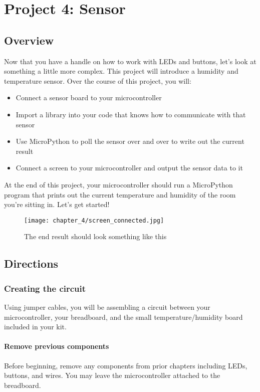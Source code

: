 \chapter{Project 4: Sensor}

\section{Overview}
Now that you have a handle on how to work with LEDs and buttons, let's look at something a little more complex.
This project will introduce a humidity and temperature sensor. Over the course of this project, you will:
\begin{itemize}
    \item Connect a sensor board to your microcontroller
    \item Import a library into your code that knows how to communicate with that sensor
    \item Use MicroPython to poll the sensor over and over to write out the current result
    \item Connect a screen to your microcontroller and output the sensor data to it
\end{itemize}
At the end of this project, your microcontroller should run a MicroPython program that prints out the current
temperature and humidity of the room you're sitting in. Let's get started!
\begin{figure}[H]
\centering
    \texttt{[image: chapter\_4/screen\_connected.jpg]}
    \caption{The end result should look something like this}
\end{figure}

\pagebreak

\section{Directions}

\subsection{Creating the circuit}
Using jumper cables, you will be assembling a circuit between your microcontroller, your breadboard, and the small
temperature/humidity board included in your kit.

\subsubsection{Remove previous components}
Before beginning, remove any components from prior chapters including LEDs, buttons, and wires. You may leave the
microcontroller attached to the breadboard.

